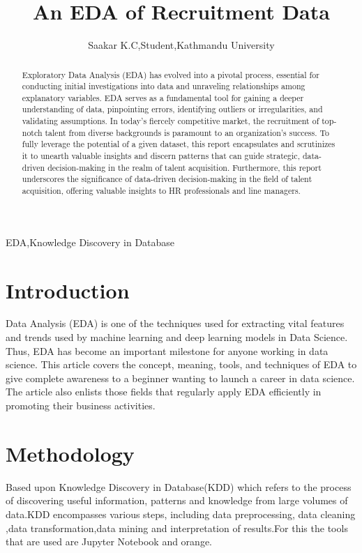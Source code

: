 \documentclass[lettersize,journal]{IEEEtran}
\begin{document}
\title{An EDA of Recruitment Data}

\author{Saakar K.C,\hspace{1mm}Student,\hspace{1mm}Kathmandu University}
\maketitle
    
\begin{abstract}
Exploratory Data Analysis (EDA) has evolved into a pivotal process, essential for conducting initial investigations into data and unraveling relationships among explanatory variables. EDA serves as a fundamental tool for gaining a deeper understanding of data, pinpointing errors, identifying outliers or irregularities, and validating assumptions. In today's fiercely competitive market, the recruitment of top-notch talent from diverse backgrounds is paramount to an organization's success. To fully leverage the potential of a given dataset, this report encapsulates and scrutinizes it to unearth valuable insights and discern patterns that can guide strategic, data-driven decision-making in the realm of talent acquisition. Furthermore, this report underscores the significance of data-driven decision-making in the field of talent acquisition, offering valuable insights to HR professionals and line managers.
\end{abstract}

\begin{IEEEkeywords}
EDA,Knowledge Discovery in Database
\end{IEEEkeywords}

\section{Introduction}
 Data Analysis (EDA) is one of the techniques used for extracting vital features and trends used by machine learning and deep learning models in Data Science. Thus, EDA has become an important milestone for anyone working in data science. This article covers the concept, meaning, tools, and techniques of EDA to give complete awareness to a beginner wanting to launch a career in data science. The article also enlists those fields that regularly apply EDA efficiently in promoting their business activities.  


\section{Methodology}
Based upon Knowledge Discovery in Database(KDD) which refers to the process of discovering useful information, patterns and  knowledge from large volumes of data.KDD encompasses various steps, including data preprocessing, data cleaning ,data transformation,data mining and interpretation of results.For this the tools that are used are Jupyter Notebook and orange.
\end{document}
